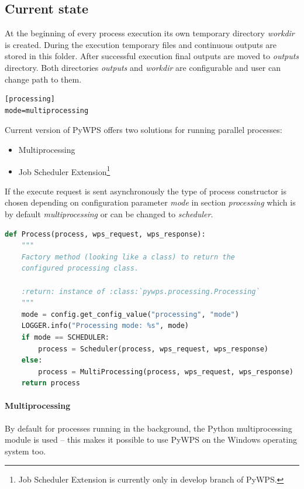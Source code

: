 \documentclass[12pt,a4paper]{article}
\begin{document}
\subsection{Current state}
\label{subsec:current_state}
At the beginning of every process execution its own temporary directory \textit{workdir} is created. During the execution
temporary files and continuous outputs are stored in this folder. After successful execution final outputs are
moved to \textit{outputs} directory. Both directories \textit{outputs} and \textit{workdir} are configurable and user can
change path to them.

\bigskip
\begin{lstlisting}[basicstyle=\small,caption={pywps.cfg - mode parameter}]
[processing]
mode=multiprocessing
\end{lstlisting}

Current version of PyWPS offers two solutions for running parallel processes:
\begin{itemize}
\item Multiprocessing
\item Job Scheduler Extension\footnote{Job Scheduler Extension is currently only in develop branch of PyWPS.}
\end{itemize}

If the execute request is sent asynchronously the type of process constructor is chosen depending on configuration
parameter \textit{mode} in section \textit{processing} which is by default \textit{multiprocessing} or can be changed 
to \textit{scheduler}.

\bigskip
\begin{lstlisting}[basicstyle=\small,caption={processing.\_\_init\_\_.py},label={lst:Process_init},language=python]
def Process(process, wps_request, wps_response):
    """
    Factory method (looking like a class) to return the
    configured processing class.

    :return: instance of :class:`pywps.processing.Processing`
    """
    mode = config.get_config_value("processing", "mode")
    LOGGER.info("Processing mode: %s", mode)
    if mode == SCHEDULER:
        process = Scheduler(process, wps_request, wps_response)
    else:
        process = MultiProcessing(process, wps_request, wps_response)
    return process
\end{lstlisting}
\bigskip
\bigskip

\paragraph{Multiprocessing}
By default for   processes   running   in   the   background,   the   Python multiprocessing module is used – 
this makes it possible to use PyWPS on the Windows operating system too.
\end{document}
